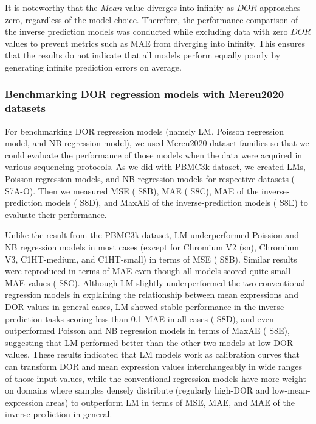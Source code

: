 \documentclass{article}
\begin{document}
It is noteworthy that the $Mean$ value diverges into infinity as $DOR$ approaches zero, regardless of the model 
choice. Therefore, the performance comparison of the inverse prediction models was conducted while excluding 
data with zero $DOR$ values to prevent metrics such as MAE from diverging into infinity. This ensures that the 
results do not indicate that all models perform equally poorly by generating infinite prediction errors on average.

\subsubsection*{Benchmarking DOR regression models with Mereu2020 datasets}
For benchmarking DOR regression models (namely LM, Poisson regression model, and NB regression model), we 
used Mereu2020 dataset families so that we could evaluate the performance of those models when the data were 
acquired in various sequencing protocols. As we did with PBMC3k dataset, we created LMs, Poisson regression 
models, and NB regression models for respective datasets (\figurename{ S7A-O}). Then we measured MSE (\figurename{ S8B}), 
MAE (\figurename{ S8C}), MAE of the inverse-prediction models (\figurename{ S8D}), and MaxAE of the inverse-prediction 
models (\figurename{ S8E}) to evaluate their performance.

Unlike the result from the PBMC3k dataset, LM underperformed Poission and NB regression models in most 
cases (except for Chromium V2 (sn), Chromium V3, C1HT-medium, and C1HT-small) in terms of MSE (\figurename{ S8B}). 
Similar results were reproduced in terms of MAE even though all models scored quite small MAE values 
(\figurename{ S8C}). Although LM slightly underperformed the two conventional regression models in explaining the relationship 
between mean expressions and DOR values in general cases, LM showed stable performance in the inverse-prediction 
tasks scoring less than 0.1 MAE in all cases (\figurename{ S8D}), and even outperformed Poisson and NB regression models 
in terms of MaxAE (\figurename{ S8E}), suggesting that LM performed better than the other two models at low DOR 
values. These results indicated that LM models work as calibration curves that can transform DOR and mean 
expression values interchangeably in wide ranges of those input values, while the conventional regression models 
have more weight on domains where samples densely distribute (regularly high-DOR and low-mean-expression 
areas) to outperform LM in terms of MSE, MAE, and MAE of the inverse prediction in general.
\end{document}
